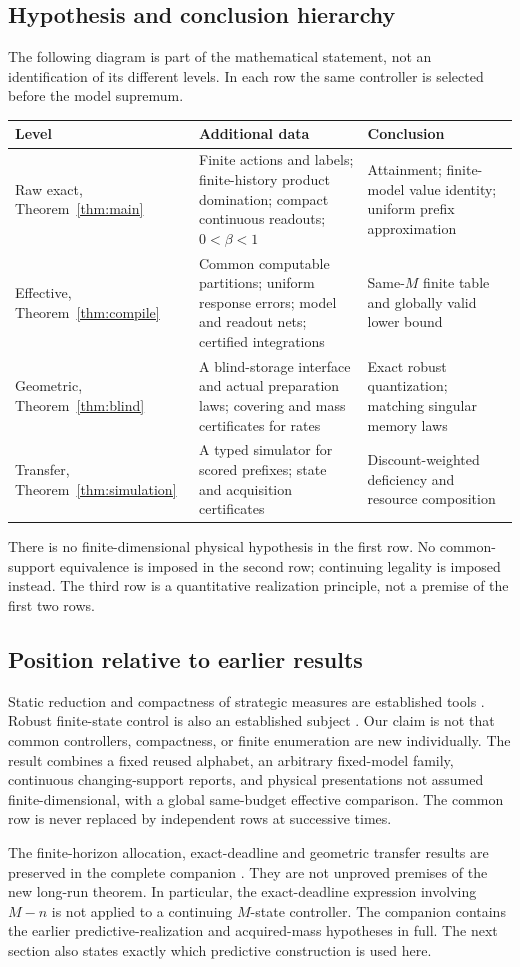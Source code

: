 \subsection{Hypothesis and conclusion hierarchy}
The following diagram is part of the mathematical statement, not an identification of its different levels. In each row the same controller is selected before the model supremum.
\begin{center}\small
\begin{tabular}{p{.22\linewidth}p{.35\linewidth}p{.34\linewidth}}
\toprule
Level & Additional data & Conclusion\\\midrule
Raw exact, Theorem~\ref{thm:main} & Finite actions and labels; finite-history product domination; compact continuous readouts; $0<\beta<1$ & Attainment; finite-model value identity; uniform prefix approximation\\[3pt]
Effective, Theorem~\ref{thm:compile} & Common computable partitions; uniform response errors; model and readout nets; certified integrations & Same-$M$ finite table and globally valid lower bound\\[3pt]
Geometric, Theorem~\ref{thm:blind} & A blind-storage interface and actual preparation laws; covering and mass certificates for rates & Exact robust quantization; matching singular memory laws\\[3pt]
Transfer, Theorem~\ref{thm:simulation} & A typed simulator for scored prefixes; state and acquisition certificates & Discount-weighted deficiency and resource composition\\\bottomrule
\end{tabular}\end{center}
There is no finite-dimensional physical hypothesis in the first row. No common-support equivalence is imposed in the second row; continuing legality is imposed instead. The third row is a quantitative realization principle, not a premise of the first two rows.

\subsection{Position relative to earlier results}
Static reduction and compactness of strategic measures are established tools \cite{Witsenhausen,YukselSaldi,Yuksel,Hogeboom}. Robust finite-state control is also an established subject \cite{Cubuktepe,Andriushchenko}. Our claim is not that common controllers, compactness, or finite enumeration are new individually. The result combines a fixed reused alphabet, an arbitrary fixed-model family, continuous changing-support reports, and physical presentations not assumed finite-dimensional, with a global same-budget effective comparison. The common row is never replaced by independent rows at successive times.

The finite-horizon allocation, exact-deadline and geometric transfer results are preserved in the complete companion \cite{FiniteHorizon}. They are not unproved premises of the new long-run theorem. In particular, the exact-deadline expression involving $M-n$ is not applied to a continuing $M$-state controller. The companion contains the earlier predictive-realization and acquired-mass hypotheses in full. The next section also states exactly which predictive construction is used here.
